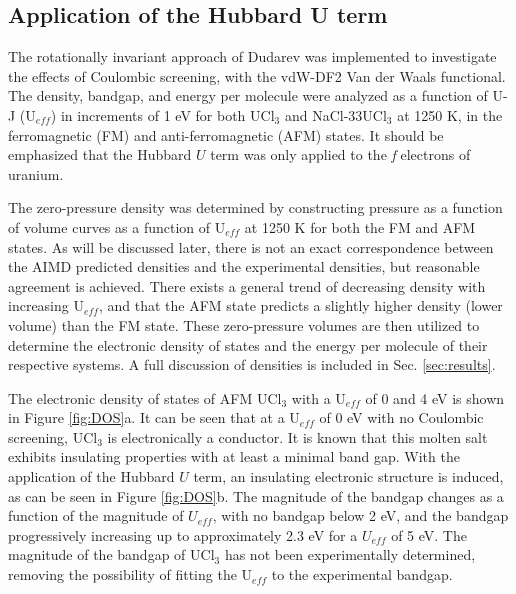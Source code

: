 \documentclass[preprint,3p,10pt,onecolumn,number,sort&compress]{elsarticle}
\begin{document}
{\color{red}\subsection{Application of the Hubbard U term}
\label{sec:hubbard}
The rotationally invariant approach of Dudarev \cite{dudarev1998} was implemented to investigate the effects of Coulombic screening, with the vdW-DF2 Van der Waals functional. The density, bandgap, and energy per molecule were analyzed as a function of U-J (U$_{eff}$) in increments of 1 eV for both UCl$_3$ and NaCl-33UCl$_3$ at 1250 K, in the ferromagnetic (FM) and anti-ferromagnetic (AFM) states. It should be emphasized that the Hubbard $U$ term was only applied to the \textit{f} electrons of uranium. 

The zero-pressure density was determined by constructing pressure as a function of volume curves as a function of U$_{eff}$ at 1250 K for both the FM and AFM states. As will be discussed later, there is not an exact correspondence between the AIMD predicted densities and the experimental densities, but reasonable agreement is achieved. There exists a general trend of decreasing density with increasing U$_{eff}$, and that the AFM state predicts a slightly higher density (lower volume) than the FM state. These zero-pressure volumes are then utilized to determine the electronic density of states and the energy per molecule of their respective systems. A full discussion of densities is included in Sec. \ref{sec:results}. 

The electronic density of states of AFM UCl$_3$ with a U$_{eff}$ of 0 and 4 eV is shown in Figure \ref{fig:DOS}a. It can be seen that at a U$_{eff}$ of 0 eV with no Coulombic screening, UCl$_3$ is electronically a conductor. It is known that this molten salt exhibits insulating properties with at least a minimal band gap. With the application of the Hubbard $U$ term, an insulating electronic structure is induced, as can be seen in Figure \ref{fig:DOS}b. The magnitude of the bandgap changes as a function of the magnitude of $U_{eff}$, with no bandgap below 2 eV, and the bandgap progressively increasing up to approximately 2.3 eV for a $U_{eff}$ of 5 eV. The magnitude of the bandgap of UCl$_3$ has not been experimentally determined, removing the possibility of fitting the U$_{eff}$ to the experimental bandgap. 

}
\end{document}
